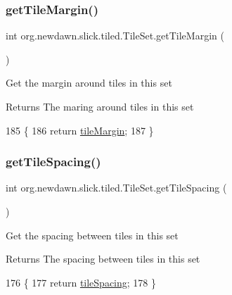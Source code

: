 \subsubsection{\texorpdfstring{get\+Tile\+Margin()}{getTileMargin()}}
{\footnotesize\ttfamily int org.\+newdawn.\+slick.\+tiled.\+Tile\+Set.\+get\+Tile\+Margin (\begin{DoxyParamCaption}{ }\end{DoxyParamCaption})\hspace{0.3cm}{\ttfamily [inline]}}

Get the margin around tiles in this set

\begin{DoxyReturn}{Returns}
The maring around tiles in this set 
\end{DoxyReturn}

\begin{DoxyCode}
185                                \{
186         \textcolor{keywordflow}{return} \mbox{\hyperlink{classorg_1_1newdawn_1_1slick_1_1tiled_1_1_tile_set_a2d51fd9dbb8548f1a885f47885ec0a32}{tileMargin}};
187     \}
\end{DoxyCode}
\mbox{\label{classorg_1_1newdawn_1_1slick_1_1tiled_1_1_tile_set_a0f0f7de2e47871ca036080444fd0801a}} 
\subsubsection{\texorpdfstring{get\+Tile\+Spacing()}{getTileSpacing()}}
{\footnotesize\ttfamily int org.\+newdawn.\+slick.\+tiled.\+Tile\+Set.\+get\+Tile\+Spacing (\begin{DoxyParamCaption}{ }\end{DoxyParamCaption})\hspace{0.3cm}{\ttfamily [inline]}}

Get the spacing between tiles in this set

\begin{DoxyReturn}{Returns}
The spacing between tiles in this set 
\end{DoxyReturn}

\begin{DoxyCode}
176                                 \{
177         \textcolor{keywordflow}{return} \mbox{\hyperlink{classorg_1_1newdawn_1_1slick_1_1tiled_1_1_tile_set_a0f7faa748f39e0211e7d56bb5f1088c8}{tileSpacing}};
178     \}
\end{DoxyCode}
\mbox{\label{classorg_1_1newdawn_1_1slick_1_1tiled_1_1_tile_set_aab39d1236f2bed7845bebc07e6cfc735}} 
